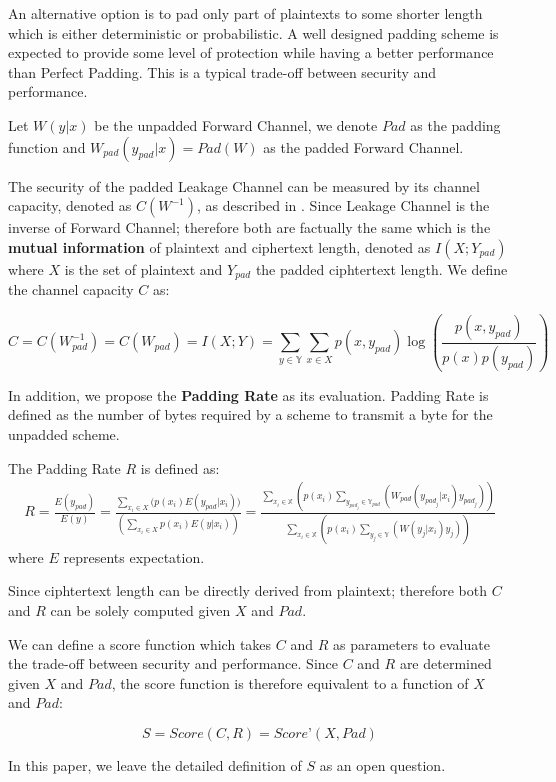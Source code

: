 An alternative option is to pad only part of plaintexts to some shorter length which is either deterministic or probabilistic. A well designed padding scheme is expected to provide some level of protection while having a better performance than Perfect Padding. This is a typical trade-off between security and performance.
\begin{definition}
Let $W(y|x)$ be the unpadded Forward Channel, we denote $Pad$ as the padding function and $W_{pad}(y_{pad}|x) = Pad(W)$ as the padded Forward Channel.
\end{definition}

The security of the padded Leakage Channel can be measured by its channel capacity, denoted as $C(W^{-1})$, as described in \cite{Web2}. Since Leakage Channel is the inverse of Forward Channel; therefore both are factually the same which is the \textbf{mutual information} of plaintext and ciphertext length, denoted as $I(X;Y_{pad})$ where $X$ is the set of plaintext and $Y_{pad}$ the padded ciphtertext length. We define the channel capacity $C$ as:
\begin{definition}
\begin{equation}
C=C(W_{pad}^{-1})=C(W_{pad})=I(X;Y)=\sum\limits_{y \in \mathbb{Y}}{\sum\limits_{x \in X}{p(x,y_{pad}) \log(\frac{p(x,y_{pad})}{p(x)p(y_{pad})})}}
\end{equation}
\end{definition}

In addition, we propose the \textbf{Padding Rate} as its evaluation. Padding Rate is defined as the number of bytes required by a scheme to transmit a byte for the unpadded scheme. 
\begin{definition}
The Padding Rate $R$ is defined as:
\begin{equation}
\begin{aligned}
R=\frac{E(y_{pad})}{E(y)}=\frac{\sum\limits_{x_i \in X}{(p(x_i)E(y_{pad}|x_i)})}{(\sum\limits_{x_i \in X}{p(x_i)E(y|x_i)})}=
\frac
{
\sum\limits_
	{
		x_i \in \mathbb{X}
	}
	{(
		p(x_i)
		\sum\limits_
		{
			y_{pad_j} \in \mathbb{Y}_{pad}
		}
		{(
			W_{pad}(y_{pad_j}|x_i)y_{pad_j}
		)}
	)}
}
{
\sum\limits_
	{
		x_i \in \mathbb{X}
	}
	{(
		p(x_i)
		\sum\limits_
		{
			y_j \in \mathbb{Y}
		}
		{(
			W(y_j|x_i)y_j
		)}
	)}
}
\end{aligned}
\end{equation}
where $E$ represents expectation.
\end{definition}

Since ciphtertext length can be directly derived from plaintext; therefore both $C$ and $R$ can be solely computed given $X$ and $Pad$. 

We can define a score function which takes $C$ and $R$ as parameters to evaluate the trade-off between security and performance. Since $C$ and $R$ are determined given $X$ and $Pad$, the score function is therefore equivalent to a function of $X$ and $Pad$:
\begin{definition}
\begin{equation}
S = Score(C,R) = Score’(X, Pad)
\end{equation}
\end{definition}
In this paper, we leave the detailed definition of $S$ as an open question.
